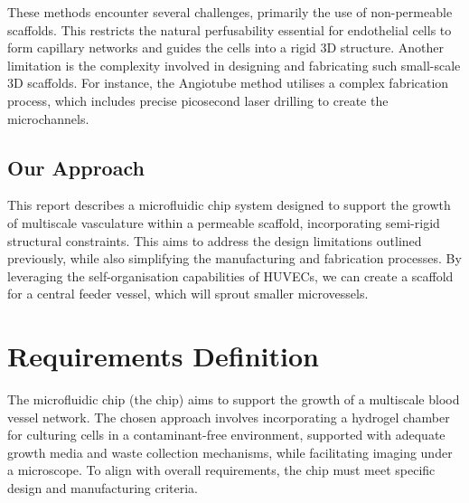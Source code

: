 \documentclass[letterpaper,12pt]{article}
\begin{document}
These methods encounter several challenges, primarily the use of non-permeable scaffolds. This restricts the natural perfusability essential for endothelial cells to form capillary networks and guides the cells into a rigid 3D structure. Another limitation is the complexity involved in designing and fabricating such small-scale 3D scaffolds. For instance, the Angiotube method utilises a complex fabrication process, which includes precise picosecond laser drilling to create the microchannels\parencite{oconnor_2022_engineering}.

\subsection{Our Approach}

This report describes a microfluidic chip system designed to support the growth of multiscale vasculature within a permeable scaffold, incorporating semi-rigid structural constraints. This aims to address the design limitations outlined previously, while also simplifying the manufacturing and fabrication processes. By leveraging the self-organisation capabilities of HUVECs, we can create a scaffold for a central feeder vessel, which will sprout smaller microvessels.  
\newpage

\section{Requirements Definition}

The microfluidic chip (the chip) aims to support the growth of a multiscale blood vessel network. The chosen approach involves incorporating a hydrogel chamber for culturing cells in a contaminant-free environment, supported with adequate growth media and waste collection mechanisms, while facilitating imaging under a microscope. To align with overall requirements, the chip must meet specific design and manufacturing criteria.
\end{document}

